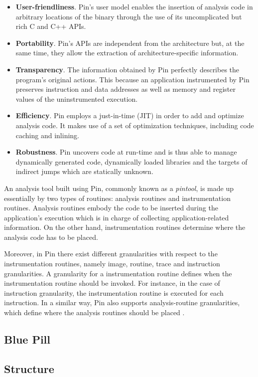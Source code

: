 \begin{itemize}
\item \textbf{User-friendliness}. Pin's user model enables the insertion of analysis code in arbitrary locations of the binary through the use of its uncomplicated but rich C and C++ APIs.
\item \textbf{Portability}. Pin's APIs are independent from the architecture but, at the same time, they allow the extraction of architecture-specific information.
\item \textbf{Transparency}. The information obtained by Pin perfectly describes the program's original actions. This because an application instrumented by Pin preserves instruction and data addresses as well as memory and register values of the uninstrumented execution. 
\item \textbf{Efficiency}. Pin employs a just-in-time (JIT) in order to add and optimize analysis code. It makes use of a set of optimization techniques, including code caching and inlining.
\item \textbf{Robustness}. Pin uncovers code at run-time and is thus able to manage dynamically generated code, dynamically loaded libraries and the targets of indirect jumps which are statically unknown. 
\end{itemize}

An analysis tool built using Pin, commonly known as a \textit{pintool}, is made up essentially by two types of routines: analysis routines and instrumentation routines. Analysis routines embody the code to be inserted during the application's execution which is in charge of collecting application-related information. On the other hand, instrumentation routines determine where the analysis code has to be placed.  

Moreover, in Pin there exist different granularities with respect to the instrumentation routines, namely image, routine, trace and instruction granularities. A granularity for a instrumentation routine defines when the instrumentation routine should be invoked. For instance, in the case of instruction granularity, the instrumentation routine is executed for each instruction. In a similar way, Pin also supports analysis-routine granularities, which define where the analysis routines should be placed \cite{6658603}.

\subsection{Blue Pill}
\subsection{Structure}
   

